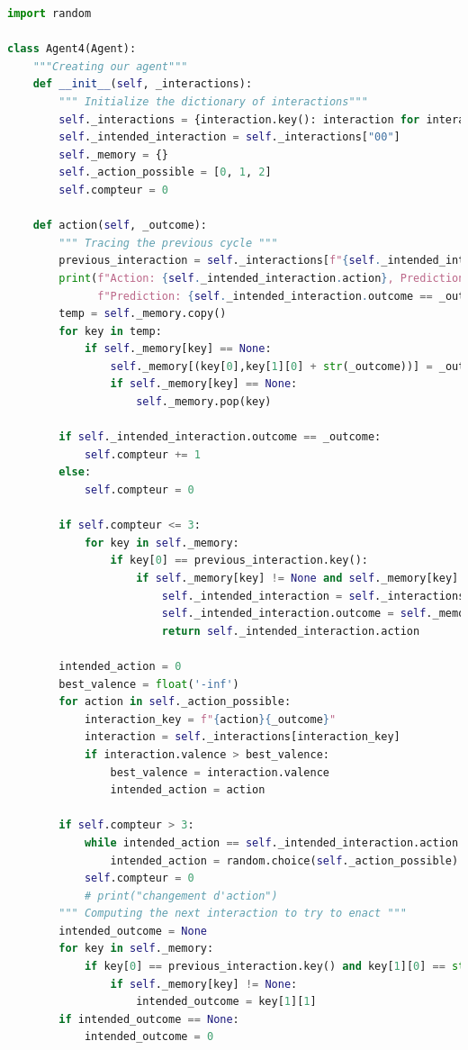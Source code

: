 \documentclass[a4paper, 12pt]{article}
\begin{document}
\begin{lstlisting}[language=Python, caption={Implementation de l'Agent4}]
import random

class Agent4(Agent):
    """Creating our agent"""
    def __init__(self, _interactions):
        """ Initialize the dictionary of interactions"""
        self._interactions = {interaction.key(): interaction for interaction in _interactions}
        self._intended_interaction = self._interactions["00"]
        self._memory = {}
        self._action_possible = [0, 1, 2]
        self.compteur = 0
        
    def action(self, _outcome):
        """ Tracing the previous cycle """
        previous_interaction = self._interactions[f"{self._intended_interaction.action}{_outcome}"]
        print(f"Action: {self._intended_interaction.action}, Prediction: {self._intended_interaction.outcome}, Outcome: {_outcome}, "
              f"Prediction: {self._intended_interaction.outcome == _outcome}, Valence: {previous_interaction.valence},")        
        temp = self._memory.copy()
        for key in temp:
            if self._memory[key] == None:
                self._memory[(key[0],key[1][0] + str(_outcome))] = _outcome
                if self._memory[key] == None:
                    self._memory.pop(key)
        
        if self._intended_interaction.outcome == _outcome:
            self.compteur += 1
        else:
            self.compteur = 0
        
        if self.compteur <= 3:
            for key in self._memory:
                if key[0] == previous_interaction.key():
                    if self._memory[key] != None and self._memory[key] > 0:
                        self._intended_interaction = self._interactions[key[1]]
                        self._intended_interaction.outcome = self._memory[key]
                        return self._intended_interaction.action
        
        intended_action = 0
        best_valence = float('-inf')
        for action in self._action_possible:
            interaction_key = f"{action}{_outcome}"
            interaction = self._interactions[interaction_key]
            if interaction.valence > best_valence:
                best_valence = interaction.valence
                intended_action = action
        
        if self.compteur > 3:
            while intended_action == self._intended_interaction.action:
                intended_action = random.choice(self._action_possible)
            self.compteur = 0
            # print("changement d'action")
        """ Computing the next interaction to try to enact """
        intended_outcome = None
        for key in self._memory:
            if key[0] == previous_interaction.key() and key[1][0] == str(intended_action):
                if self._memory[key] != None:
                    intended_outcome = key[1][1]
        if intended_outcome == None:
            intended_outcome = 0
        

\end{lstlisting}
\end{document}
